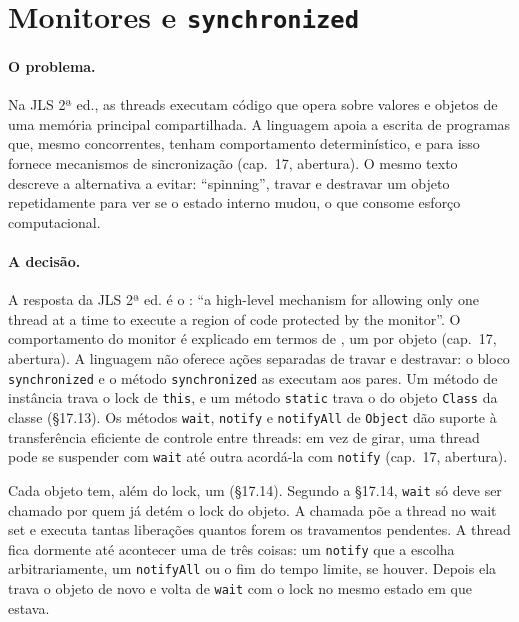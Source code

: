 \section{Monitores e \texttt{synchronized}}
\label{sec:monitores}

\paragraph{O problema.}
Na JLS 2ª ed., as threads executam código que opera sobre valores e
objetos de uma memória principal compartilhada. A linguagem apoia a escrita de
programas que, mesmo concorrentes, tenham comportamento determinístico,
e para isso fornece mecanismos de sincronização (cap.~17, abertura). O
mesmo texto descreve a alternativa a evitar: \enquote{spinning}, travar
e destravar um objeto repetidamente para ver se o estado interno mudou,
o que consome esforço computacional.

\paragraph{A decisão.}
A resposta da JLS 2ª ed. é o :
\enquote{a high-level mechanism for allowing only one thread at a time
to execute a region of code protected by the monitor}. O comportamento
do monitor é explicado em termos de , um por objeto (cap.~17, abertura). A linguagem não oferece
ações separadas de travar e destravar: o bloco \texttt{synchronized} e
o método \texttt{synchronized} as executam aos pares. Um método de
instância trava o lock de \texttt{this}, e um método \texttt{static}
trava o do objeto \texttt{Class} da classe (§17.13). Os métodos
\texttt{wait}, \texttt{notify} e \texttt{notifyAll} de \texttt{Object}
dão suporte à transferência eficiente de controle entre threads: em vez
de girar, uma thread pode se suspender com \texttt{wait} até outra
acordá-la com \texttt{notify}
(cap.~17, abertura).

Cada objeto tem, além do lock, um  (§17.14). Segundo a §17.14, \texttt{wait} só deve ser
chamado por quem já detém o lock do objeto. A chamada põe a thread no
wait set e executa tantas liberações quantos forem os travamentos
pendentes. A thread fica dormente até acontecer uma de três coisas: um
\texttt{notify} que a escolha arbitrariamente, um \texttt{notifyAll} ou
o fim do tempo limite, se houver. Depois ela trava o objeto de novo e
volta de \texttt{wait} com o lock no mesmo estado em que estava.

